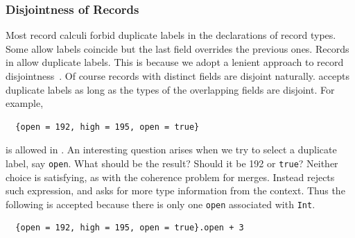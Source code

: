 \subsubsection{Disjointness of Records}

Most record calculi forbid duplicate labels in the declarations of record types.
Some allow labels coincide but the last field overrides the previous ones.
Records in \name allow duplicate labels. This is because we adopt a lenient
approach to record disjointness~\cite{alpuimdisjoint}. Of course records with
distinct fields are disjoint naturally. \name accepts duplicate labels as long
as the types of the overlapping fields are disjoint. For example,
\begin{lstlisting}
  {open = 192, high = 195, open = true}
\end{lstlisting}
is allowed in \name. An interesting question arises when we try to select a
duplicate label, say \lstinline{open}. What should be the result? Should it be
192 or \lstinline{true}? Neither choice is satisfying, as with the coherence
problem for merges. Instead \name rejects such expression, and asks for more
type information from the context. Thus the following is accepted because there
is only one \lstinline{open} associated with \lstinline{Int}.
\begin{lstlisting}
  {open = 192, high = 195, open = true}.open + 3
\end{lstlisting}

